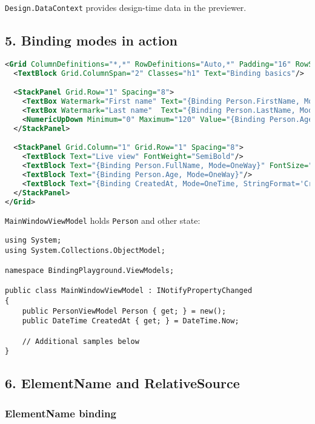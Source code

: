 \passthrough{\lstinline!Design.DataContext!} provides design-time data
in the previewer.

\subsection{5. Binding modes in action}\label{binding-modes-in-action}

\begin{lstlisting}[language=XML]
<Grid ColumnDefinitions="*,*" RowDefinitions="Auto,*" Padding="16" RowSpacing="16" ColumnSpacing="24">
  <TextBlock Grid.ColumnSpan="2" Classes="h1" Text="Binding basics"/>

  <StackPanel Grid.Row="1" Spacing="8">
    <TextBox Watermark="First name" Text="{Binding Person.FirstName, Mode=TwoWay}"/>
    <TextBox Watermark="Last name"  Text="{Binding Person.LastName, Mode=TwoWay}"/>
    <NumericUpDown Minimum="0" Maximum="120" Value="{Binding Person.Age, Mode=TwoWay}"/>
  </StackPanel>

  <StackPanel Grid.Column="1" Grid.Row="1" Spacing="8">
    <TextBlock Text="Live view" FontWeight="SemiBold"/>
    <TextBlock Text="{Binding Person.FullName, Mode=OneWay}" FontSize="20"/>
    <TextBlock Text="{Binding Person.Age, Mode=OneWay}"/>
    <TextBlock Text="{Binding CreatedAt, Mode=OneTime, StringFormat='Created on {0:d}'}"/>
  </StackPanel>
</Grid>
\end{lstlisting}

\passthrough{\lstinline!MainWindowViewModel!} holds
\passthrough{\lstinline!Person!} and other state:

\begin{lstlisting}
using System;
using System.Collections.ObjectModel;

namespace BindingPlayground.ViewModels;

public class MainWindowViewModel : INotifyPropertyChanged
{
    public PersonViewModel Person { get; } = new();
    public DateTime CreatedAt { get; } = DateTime.Now;

    // Additional samples below
}
\end{lstlisting}

\subsection{6. ElementName and
RelativeSource}\label{elementname-and-relativesource}

\subsubsection{ElementName binding}\label{elementname-binding}

